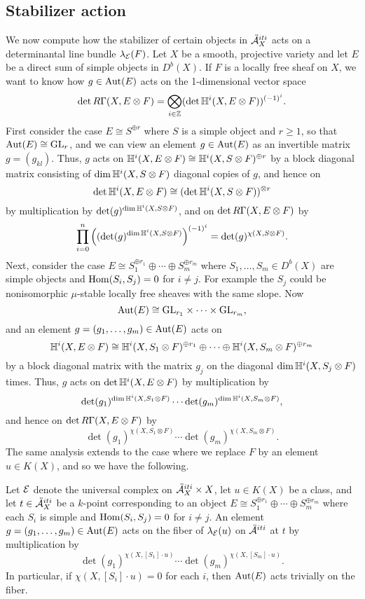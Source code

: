 \subsection{Stabilizer action}
We now compute how the stabilizer of certain objects in $\ddot{\mathcal{A}}^{iti}_X$ acts on a determinantal line bundle $\lambda_{\mathcal{E}}(F)$. Let $X$ be a smooth, projective variety and let $E$ be a direct sum of simple objects in $D^b(X)$. If $F$ is a locally free sheaf on $X$, we want to know how $g \in \mathrm{Aut}(E)$ acts on the 1-dimensional vector space
\[ \det R \Gamma(X, E \otimes F) = \bigotimes_{i \in \mathbb{Z}} (\det \mathbb{H}^i(X, E \otimes F))^{(-1)^i}. \]
First consider the case $E \cong S^{\oplus r}$ where $S$ is a simple object and $r \ge 1$, so that $\mathrm{Aut}(E) \cong \mathrm{GL}_r$, and we can view an element $g \in \mathrm{Aut}(E)$ as an invertible matrix $g = (g_{kl})$. Thus, $g$ acts on $\mathbb{H}^i(X, E \otimes F) \cong \mathbb{H}^i(X, S \otimes F)^{\oplus r}$ by a block diagonal matrix consisting of $\dim \mathbb{H}^i(X, S \otimes F)$ diagonal copies of $g$, and hence on
\[ \det \mathbb{H}^i(X, E \otimes F) \cong (\det \mathbb{H}^i(X, S \otimes F))^{\otimes r} \]
by multiplication by $\det(g)^{\dim \mathbb{H}^i(X, S \otimes F)}$, and on $\det R \Gamma(X, E \otimes F)$ by
\[ \prod_{i=0}^n \left((\det(g)^{\dim \mathbb{H}^i(X, S \otimes F)}\right)^{(-1)^i} = \det(g)^{\chi(X, S \otimes F)}. \]
Next, consider the case $E \cong S_1^{\oplus r_1} \oplus \cdots \oplus S_m^{\oplus r_m}$ where $S_1, \ldots, S_m \in D^b(X)$ are simple objects and $\mathrm{Hom}(S_i, S_j) = 0$ for $i \neq j$. For example the $S_j$ could be nonisomorphic $\mu$-stable locally free sheaves with the same slope. Now
\[ \mathrm{Aut}(E) \cong \mathrm{GL}_{r_1} \times \cdots \times \mathrm{GL}_{r_m}, \]
and an element $g = (g_1, \ldots, g_m) \in \mathrm{Aut}(E)$ acts on
\[ \mathbb{H}^i(X, E \otimes F) \cong \mathbb{H}^i(X, S_1 \otimes F)^{\oplus r_1} \oplus \cdots \oplus \mathbb{H}^i(X, S_m \otimes F)^{\oplus r_m} \]
by a block diagonal matrix with the matrix $g_j$ on the diagonal $ \dim \mathbb{H}^i(X, S_j \otimes F)$ times. Thus, $g$ acts on $\det \mathbb{H}^i(X, E \otimes F)$ by multiplication by
\[ \det(g_1)^{\dim \mathbb{H}^i(X, S_1 \otimes F)} \cdots \det(g_m)^{\dim \mathbb{H}^i(X, S_m \otimes F)}, \]
and hence on $\det R \Gamma(X, E \otimes F)$ by
\[ \det(g_1)^{\chi(X, S_1 \otimes F)} \cdots \det(g_m)^{\chi(X, S_m \otimes F)}. \]
The same analysis extends to the case where we replace $F$ by an element $u \in K(X)$, and so we have the following.
\begin{prop}\label{lbtogms}
    Let $\mathcal{E}$ denote the universal complex on $\ddot{\mathcal{A}}^{iti}_X \times X$, let $u \in K(X)$ be a class, and let $t \in \ddot{\mathcal{A}}^{iti}_X$ be a $k$-point corresponding to an object $E \cong S_1^{\oplus r_1} \oplus \cdots \oplus S_m^{\oplus r_m}$ where each $S_i$ is simple and $\mathrm{Hom}(S_i, S_j) = 0$ for $i \neq j$. An element $g = (g_1,\ldots,g_m) \in \mathrm{Aut}(E)$ acts on the fiber of $\lambda_{\mathcal{E}}(u)$ on $\ddot{\mathcal{A}}^{iti}$ at $t$ by multiplication by
    \[ \det(g_1)^{\chi(X, [S_1] \cdot u)} \cdots \det(g_m)^{\chi(X, [S_m] \cdot u)}. \]
    In particular, if $\chi(X, [S_i] \cdot u) = 0$ for each $i$, then $\mathrm{Aut}(E)$ acts trivially on the fiber.
\end{prop}

